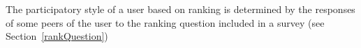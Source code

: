 The participatory style of a user based on ranking is determined by the responses of some peers of the user to the ranking question included in a survey (see Section~\ref{rankQuestion})